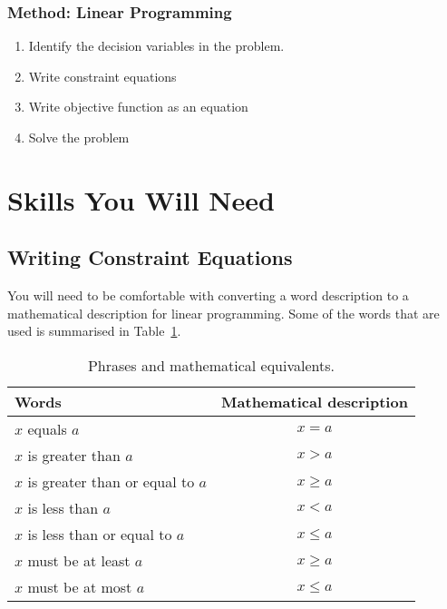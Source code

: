 \subsubsection{Method: Linear Programming}{
\begin{enumerate}
\item{Identify the decision variables in the problem.}
\item{Write constraint equations}
\item{Write objective function as an equation}
\item{Solve the problem}
\end{enumerate}}

\section{Skills You Will Need}
\subsection{Writing Constraint Equations}
You will need to be comfortable with converting a word description to a mathematical description for linear programming. Some of the words that are used is summarised in Table~\ref{m:lp11:language}.

\begin{table}[htbp]
\begin{center}
\caption{Phrases and mathematical equivalents.}
\label{m:lp11:language}
\begin{tabular}{|l|c|}\hline
Words & Mathematical description\\\hline\hline
$x$ equals $a$ & $x = a$ \\
$x$ is greater than $a$ & $x > a$\\
$x$ is greater than or equal to $a$ & $x \geq a$\\
$x$ is less than $a$ & $x < a$ \\
$x$ is less than or equal to $a$ & $x \leq a$ \\
$x$ must be at least $a$ & $x \geq a$ \\
$x$ must be at most $a$ & $x \leq a$\\\hline
\end{tabular}
\end{center}
\end{table}

